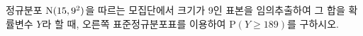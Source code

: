 \noindent\begin{minipage}[t]{0.58\linewidth}\vspace{0pt}\raggedright 정규분포 $\mathrm{N}(15{,}\mkern3mu\mathopen{}9^2)$을 따르는 모집단에서 크기가 9인 표본을 임의추출하여 그 합을 확률변수 $Y$라 할 때, 오른쪽 표준정규분포표를 이용하여 $\mathrm{P}(Y\ge 189)$를 구하시오.\end{minipage}\hfill\begin{minipage}[t]{0.4\linewidth}\vspace{0pt}\centering \resizebox{\ifdim\width>\linewidth\linewidth\else\width\fi}{!}{}\end{minipage}\par

